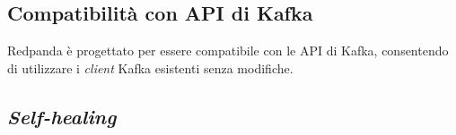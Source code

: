 \subsection{Compatibilità con API di Kafka}
Redpanda è progettato per essere compatibile con le API di Kafka, consentendo di utilizzare i \textit{client} Kafka esistenti senza modifiche.

\subsection{\textit{Self-healing}}


